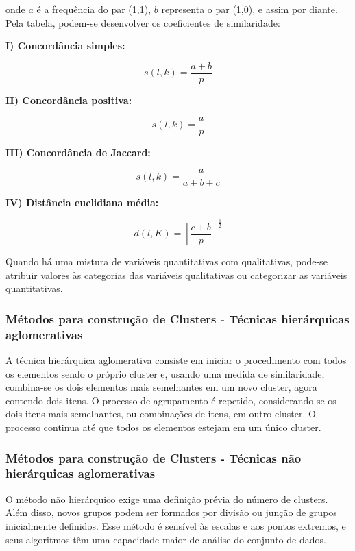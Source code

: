 \documentclass[
  portuguese,
]{estat/estat}
\begin{document}
onde \(a\) é a frequência do par (1,1), \(b\) representa o par (1,0), e
assim por diante. Pela tabela, podem-se desenvolver os coeficientes de
similaridade:

\textbf{I) Concordância simples:}

\[
s(l,k) = \frac{a+b}{p}
\]

\textbf{II) Concordância positiva:}

\[
s(l,k) = \frac{a}{p}
\]

\textbf{III) Concordância de Jaccard:}

\[
s(l,k) = \frac{a}{a+b+c}
\]

\textbf{IV) Distância euclidiana média:}

\[
d(l,K) = \left[ \frac{c+b}{p} \right]^{\frac{1}{2}}
\]

Quando há uma mistura de variáveis quantitativas com qualitativas,
pode-se atribuir valores às categorias das variáveis qualitativas ou
categorizar as variáveis quantitativas.

\subsubsection{Métodos para construção de Clusters - Técnicas
hierárquicas
aglomerativas}\label{muxe9todos-para-construuxe7uxe3o-de-clusters---tuxe9cnicas-hieruxe1rquicas-aglomerativas}

A técnica hierárquica aglomerativa consiste em iniciar o procedimento
com todos os elementos sendo o próprio cluster e, usando uma medida de
similaridade, combina-se os dois elementos mais semelhantes em um novo
cluster, agora contendo dois itens. O processo de agrupamento é
repetido, considerando-se os dois itens mais semelhantes, ou combinações
de itens, em outro cluster. O processo continua até que todos os
elementos estejam em um único cluster.

\subsubsection{Métodos para construção de Clusters - Técnicas não
hierárquicas
aglomerativas}\label{muxe9todos-para-construuxe7uxe3o-de-clusters---tuxe9cnicas-nuxe3o-hieruxe1rquicas-aglomerativas}

O método não hierárquico exige uma definição prévia do número de
clusters. Além disso, novos grupos podem ser formados por divisão ou
junção de grupos inicialmente definidos. Esse método é sensível às
escalas e aos pontos extremos, e seus algoritmos têm uma capacidade
maior de análise do conjunto de dados.
\end{document}
